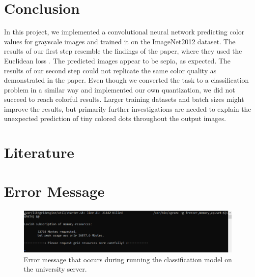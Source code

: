 \documentclass[12pt,letterpaper]{article}
\begin{document}
\section{Conclusion}
In this project, we implemented a convolutional neural network predicting color values for grayscale images \citep{Zhang.2016} and trained it on the ImageNet2012 dataset. The results of our first step resemble the findings of the paper, where they used the Euclidean loss \citep{Zhang.2016}. The predicted images appear to be sepia, as expected. The results of our second step could not replicate the same color quality as demonstrated in the paper. Even though we converted the task to a classification problem in a similar way and implemented our own quantization, we did not succeed to reach colorful results. Larger training datasets and batch sizes might improve the results, but primarily further investigations are needed to explain the unexpected prediction of tiny colored dots throughout the output images.
\newpage
\thispagestyle{empty}
\section{Literature}
\label{Lit}

\renewcommand{\bibsection}{}



\newpage
\thispagestyle{empty}
\appendix
{}
\section{Error Message}
\begin{figure}[ht]
	\centering
	\includegraphics[width=1.0\textwidth]{error.png}
	\caption{Error message that occurs during running the classification model on the university server.}
	\label{error}
\end{figure}
\newpage
{}
\end{document}

